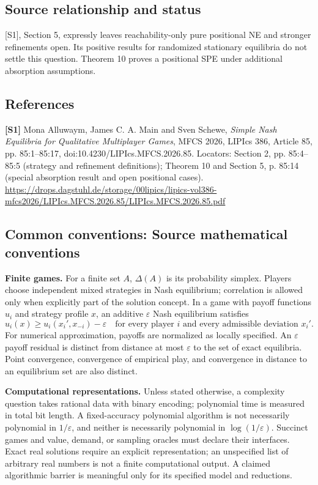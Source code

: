 \documentclass[11pt,a4paper]{article}
\begin{document}
\subsection*{Source relationship and status}
[S1], Section 5, expressly leaves reachability-only pure positional NE and stronger refinements open. Its positive results for randomized stationary equilibria do not settle this question. Theorem 10 proves a positional SPE under additional absorption assumptions.
\subsection*{References}
\begingroup\footnotesize\raggedright
\textbf{[S1]} Mona Alluwaym, James C. A. Main and Sven Schewe, \emph{Simple Nash Equilibria for Qualitative Multiplayer Games}, MFCS 2026, LIPIcs 386, Article 85, pp. 85:1--85:17, doi:10.4230/LIPIcs.MFCS.2026.85. Locators: Section 2, pp. 85:4--85:5 (strategy and refinement definitions); Theorem 10 and Section 5, p. 85:14 (special absorption result and open positional cases). \url{https://drops.dagstuhl.de/storage/00lipics/lipics-vol386-mfcs2026/LIPIcs.MFCS.2026.85/LIPIcs.MFCS.2026.85.pdf}
\par\endgroup

\subsection*{Common conventions: Source mathematical conventions}

\textbf{Finite games.} For a finite set $A$, $\Delta(A)$ is its probability
simplex. Players choose independent mixed strategies in Nash equilibrium;
correlation is allowed only when explicitly part of the solution concept.
In a game with payoff functions $u_i$ and strategy profile $x$, an additive
$\varepsilon$ Nash equilibrium satisfies
\[
 u_i(x)\geq u_i(x_i',x_{-i})-\varepsilon
 \quad\text{for every player $i$ and every admissible deviation $x_i'$}.
\]
For numerical approximation, payoffs are normalized as locally specified.
An $\varepsilon$ payoff residual is distinct from distance at most
$\varepsilon$ to the set of exact equilibria. Point convergence, convergence
of empirical play, and convergence in distance to an equilibrium set are
also distinct.

\textbf{Computational representations.} Unless stated otherwise, a complexity
question takes rational data with binary encoding; polynomial time is measured
in total bit length. A fixed-accuracy polynomial algorithm is not necessarily
polynomial in $1/\varepsilon$, and neither is necessarily polynomial in
$\log(1/\varepsilon)$. Succinct games and value, demand, or sampling oracles
must declare their interfaces. Exact real solutions require an explicit
representation; an unspecified list of arbitrary real numbers is not a
finite computational output. A claimed algorithmic barrier is meaningful
only for its specified model and reductions.
\end{document}
